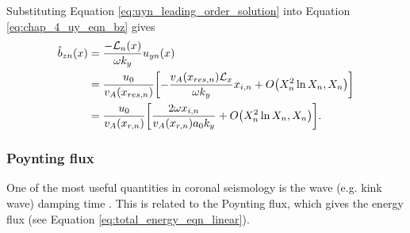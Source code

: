 Substituting Equation \eqref{eq:uyn_leading_order_solution} into Equation \eqref{eq:chap_4_uy_eqn_bz} gives
\begin{equation}
\label{eq:bzn_leading_order_solution}
\begin{aligned}
    \hat{b}_{zn}(x) &= \frac{-\mathcal{L}_n(x)}{\omega k_y}u_{yn}(x) \\
    &= \frac{u_0}{v_{A}(x_{res,n})}\qty[-\frac{v_{A}(x_{res,n})\mathcal{L}_x}{\omega k_y}x_{i,n} + O\qty(X_n^2\ln X_n, X_n)] \\
    &= \frac{u_0}{v_{A}(x_{r,n})}\qty[\frac{2\omega x_{i,n}}{v_{A}(x_{r,n})a_0k_y} + O\qty(X_n^2\ln X_n, X_n)].
\end{aligned}
\end{equation}

\subsubsection{Poynting flux}

One of the most useful quantities in coronal seismology is the wave (e.g. kink wave) damping time \citep{Ruderman2002, Giagkiozis2016}. This is related to the Poynting flux, which gives the energy flux (see Equation \ref{eq:total_energy_eqn_linear}).

